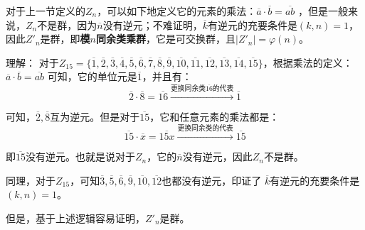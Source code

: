 \documentclass[12pt]{article}
\begin{document}
\begin{framed}
对于上一节定义的$Z_n$，可以如下地定义它的元素的乘法：$\overline{a}\cdot \overline{b} = \overline{ab}$
，但是一般来说，$Z_n$不是群，因为$\overline{n}$没有逆元；不难证明，$\overline{k}$有逆元的充要条件是$(k,n) = 1$，因此$Z'_n$是群，即\textbf{模$n$同余类乘群}，它是可交换群，且$|Z'_n| = \varphi(n)$。
~\\

\small{
理解：
对于$Z_{15} = \{\overline{1},\overline{2},\overline{3},\overline{4},\overline{5},\overline{6},\overline{7},\overline{8},\overline{9},\overline{10},\overline{11},\overline{12},\overline{13},\overline{14},\overline{15}\}$，根据乘法的定义：$\overline{a}\cdot \overline{b} = \overline{ab}$ 可知，它的单位元是$\overline{1}$，并且有：
$$
\overline{2} \cdot \overline{8} = \overline{16} \xrightarrow{\text{更换同余类}\overline{16}\text{的代表}} \overline{1}
$$

可知，$\overline{2},\overline{8}$互为逆元。但是对于$\overline{15}$，它和任意元素的乘法都是：
$$
\overline{15}\cdot\overline{x} = \overline{15x}\xrightarrow{\text{更换同余类的代表}} \overline{15}
$$

即$\overline{15}$没有逆元。也就是说对于$Z_n$，它的$\overline{n}$没有逆元，因此$Z_n$不是群。

同理，对于$Z_{15}$，可知$\overline{3}, \overline{5}, \overline{6}, \overline{9}, \overline{10}, \overline{12}$也都没有逆元，印证了 $\overline{k}$有逆元的充要条件是$(k,n) = 1$。

但是，基于上述逻辑容易证明，$Z'_n$是群。
}
\end{framed}
\end{document}
